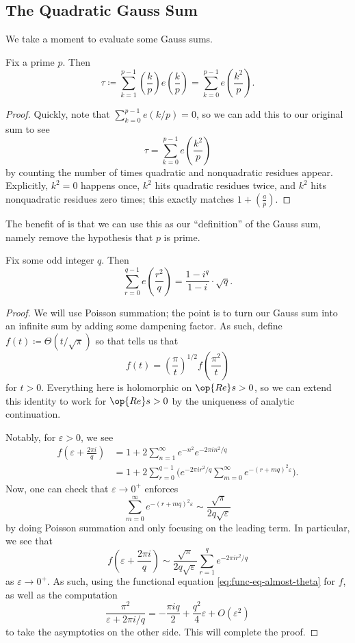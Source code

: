 \documentclass[../notes.tex]{subfiles}
\begin{document}
\subsection{The Quadratic Gauss Sum}
We take a moment to evaluate some Gauss sums.
\begin{lemma} \label{lem:adjust-quad-gauss-sum}
	Fix a prime $p$. Then
	\[\tau\coloneqq\sum_{k=1}^{p-1}\left(\frac kp\right)e\left(\frac kp\right)=\sum_{k=0}^{p-1}e\left(\frac{k^2}p\right).\]
\end{lemma}
\begin{proof}
	Quickly, note that $\sum_{k=0}^{p-1}e(k/p)=0$, so we can add this to our original sum to see
	\[\tau=\sum_{k=0}^{p-1}e\left(\frac{k^2}p\right)\]
	by counting the number of times quadratic and nonquadratic residues appear. Explicitly, $k^2=0$ happens once, $k^2$ hits quadratic residues twice, and $k^2$ hits nonquadratic residues zero times; this exactly matches $1+\left(\frac ap\right)$.
\end{proof}
The benefit of  is that we can use this as our ``definition'' of the Gauss sum, namely remove the hypothesis that $p$ is prime.
\begin{proposition} \label{prop:evaluation-of-gauss-sum}
	Fix some odd integer $q$. Then
	\[\sum_{r=0}^{q-1}e\left(\frac{r^2}q\right)=\frac{1-i^q}{1-i}\cdot\sqrt q.\]
\end{proposition}
\begin{proof}
	We will use Poisson summation; the point is to turn our Gauss sum into an infinite sum by adding some dampening factor. As such, define $f(t)\coloneqq\Theta(t/\sqrt\pi)$ so that  tells us that
	\begin{equation}
		f(t)=\left(\frac\pi t\right)^{1/2}f\left(\frac{\pi^2}t\right) \label{eq:func-eq-almost-theta}
	\end{equation}
	for $t>0$. Everything here is holomorphic on $\op{Re}s>0$, so we can extend this identity to work for $\op{Re}s>0$ by the uniqueness of analytic continuation.

	Notably, for $\varepsilon>0$, we see
	\begin{align*}
		f\left(\varepsilon+\frac{2\pi i}q\right) &= 1+2\sum_{n=1}^\infty e^{-n^2}e^{-2\pi in^2/q} \\
		&= 1+2\sum_{r=0}^{q-1}\Bigg(e^{-2\pi ir^2/q}\sum_{m=0}^\infty e^{-(r+mq)^2\varepsilon}\Bigg).
	\end{align*}
	Now, one can check that $\varepsilon\to0^+$ enforces
	\[\sum_{m=0}^\infty e^{-(r+mq)^2\varepsilon}\sim\frac{\sqrt\pi}{2q\sqrt\varepsilon}\]
	by doing Poisson summation and only focusing on the leading term. In particular, we see that
	\[f\left(\varepsilon+\frac{2\pi i}q\right)\sim\frac{\sqrt\pi}{2q\sqrt\varepsilon}\sum_{r=1}^qe^{-2\pi ir^2/q}\]
	as $\varepsilon\to0^+$. As such, using the functional equation \eqref{eq:func-eq-almost-theta} for $f$, as well as the computation
	\[\frac{\pi^2}{\varepsilon+2\pi i/q}=-\frac{\pi iq}2+\frac{q^2}4\varepsilon+O\left(\varepsilon^2\right)\]
	to take the asymptotics on the other side. This will complete the proof.
\end{proof}
\end{document}

